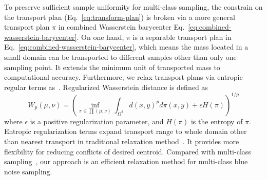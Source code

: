To preserve sufficient sample uniformity for multi-class sampling,
the constrain on the transport plan (Eq.~\ref{eq:transform-plan})
is broken via a more general transport plan $\pi$ in combined Wasserstein barycenter Eq.~\ref{eq:combined-wasserstein-barycenter}.
On one hand,
$\pi$ is a separable transport plan in Eq.~\ref{eq:combined-wasserstein-barycenter},
which means the mass located in a small domain can be transported to different samples other than only one sampling point.
It extends the minimum unit of transported mass to computational accuracy.
Furthermore,
we relax transport plans via entropic regular terms as~\cite{cuturi:2013:sinkhorn}.
Regularized Wasserstein distance is defined as
\begin{equation}\label{eq:regulate-wasserstein-distance}
 W_p(\mu,\nu)=\left(\inf\limits_{\pi\in\prod(\mu,\nu)}\int_{\Omega^2}d(x,y)^pd\pi(x,y)+\epsilon H(\pi)\right )^{1/p}
\end{equation}
where $\epsilon$ is a positive regularization parameter,
and $H(\pi)$ is the entropy of $\pi$.
Entropic regularization terms expand transport range to whole domain other than nearest transport in traditional relaxation method~\cite{balzer:2009:capacity}.
It provides more flexibility for reducing conflicts of desired centroid.
Compared with multi-class sampling~\cite{wei:2010:multi},
our approach is an efficient relaxation method for multi-class blue noise sampling.






